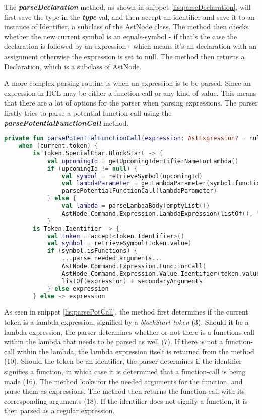 The \textbf{\textit{parseDeclaration}} method, as shown in snippet \ref{lis:parseDeclaration}, will first save the type in the \textbf{\textit{type}} val, and then accept an identifier and save it to an instance of Identifier, a subclass of the AstNode class. 
The method then checks whether the new current symbol is an equals-symbol - if that's the case the declaration is followed by an expression - which means it's an declaration with an assignment otherwise the expression is set to null. 
The method then returns a Declaration, which is a subclass of AstNode.  

A more complex parsing routine is when an expression is to be parsed. 
Since an expression in HCL may be either a function-call or any kind of value.
This means that there are a lot of options for the parser when parsing expressions.
The parser firstly tries to parse a potential function-call using the \textbf{\textit{parsePotentialFunctionCall}} method.

\begin{lstlisting}[language=Kotlin,label=lis:parsePotCall,caption=A simplified version of the parsePotentialFunctionCall method from the parser.]
private fun parsePotentialFunctionCall(expression: AstExpression? = null): AstExpression =
    when (current.token) {
        is Token.SpecialChar.BlockStart -> {
            val upcomingId = getUpcomingIdentifierNameForLambda()
            if (upcomingId != null) {
                val symbol = retrieveSymbol(upcomingId)
                val lambdaParameter = getLambdaParameter(symbol.functions, 0)
                parsePotentialFunctionCall(lambdaParameter)
            } else {
                val lambda = parseLambdaBody(emptyList())
                AstNode.Command.Expression.LambdaExpression(listOf(), lambda.type, lambda.lambdaBody)
            }
        is Token.Identifier -> {
            val token = accept<Token.Identifier>()
            val symbol = retrieveSymbol(token.value)
            if (symbol.isFunctions) {
        	    ...parse needed arguments...
        	    AstNode.Command.Expression.FunctionCall(
        	    AstNode.Command.Expression.Value.Identifier(token.value),
        	    listOf(expression) + secondaryArguments
            } else expression
        } else -> expression
\end{lstlisting}

As seen in snippet \ref{lis:parsePotCall}, the method first determines if the current token is a lambda expression, signified by a \textit{blockStart-token} (3).
Should it be a lambda expression, the parser determines whether or not there is a functions call within the lambda that needs to be parsed as well (7).
If there is not a function-call within the lambda, the lambda expression itself is returned from the method (10). 
Should the token be an identifier, the parser determines if the identifier signifies a function, in which case it is determined that a function-call is being made (16).
The method looks for the needed arguments for the function, and parse them as expressions.
The method then returns the function-call with its corresponding arguments (18).
If the identifier does not signify a function, it is then parsed as a regular expression.

